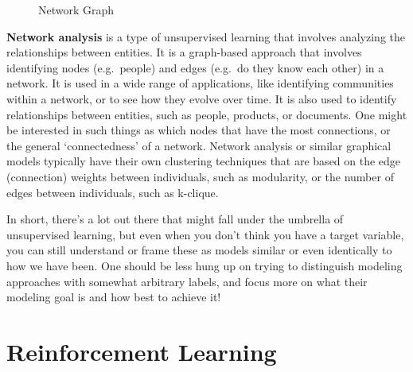 \documentclass[
  letterpaper,
]{krantz}
\begin{document}
\begin{figure}[H]


\caption{\label{fig-network-graph}Network Graph}

\end{figure}%

\textbf{Network analysis} is a type of unsupervised learning that
involves analyzing the relationships between entities. It is a
graph-based approach that involves identifying nodes (e.g.~people) and
edges (e.g.~do they know each other) in a network. It is used in a wide
range of applications, like identifying communities within a network, or
to see how they evolve over time. It is also used to identify
relationships between entities, such as people, products, or documents.
One might be interested in such things as which nodes that have the most
connections, or the general `connectedness' of a network. Network
analysis or similar graphical models typically have their own clustering
techniques that are based on the edge (connection) weights between
individuals, such as modularity, or the number of edges between
individuals, such as k-clique.

In short, there's a lot out there that might fall under the umbrella of
unsupervised learning, but even when you don't think you have a target
variable, you can still understand or frame these as models similar or
even identically to how we have been. One should be less hung up on
trying to distinguish modeling approaches with somewhat arbitrary
labels, and focus more on what their modeling goal is and how best to
achieve it!

\section{Reinforcement Learning}\label{sec-ml-more-reinforcement}
\end{document}
